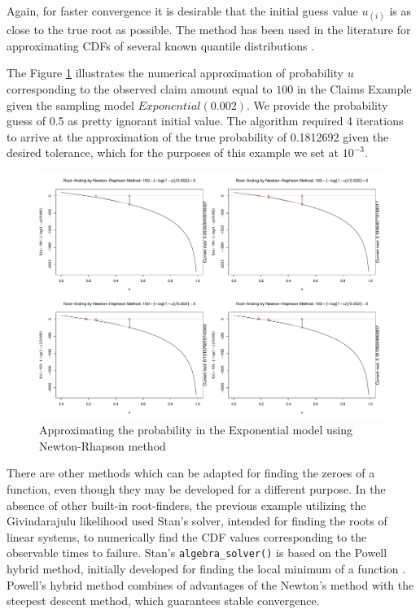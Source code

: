 \documentclass[
  12pt,
]{article}
\begin{document}
Again, for faster convergence it is desirable that the initial guess value \(u_{(i)}\) is as close to the true root as possible. The method has been used in the literature for approximating CDFs of several known quantile distributions \citetext{\citealp[see p.99 in][]{gilchrist2000StatisticalModellingQuantile}; \citealp[p.345 in][]{nair2013QuantileBasedReliabilityAnalysis}}.

The Figure \ref{fig:newton-animation-graph} illustrates the numerical approximation of probability \(u\) corresponding to the observed claim amount equal to \(100\) in the Claims Example given the sampling model \(Exponential(0.002)\). We provide the probability guess of 0.5 as pretty ignorant initial value. The algorithm required 4 iterations to arrive at the approximation of the true probability of 0.1812692 given the desired tolerance, which for the purposes of this example we set at \(10^{-3}\).

\begin{figure}

{\centering \includegraphics[width=0.5\linewidth]{img/newton-graph} 

}

\caption{Approximating the probability  in the Exponential model using Newton-Rhapson method}\label{fig:newton-animation-graph}
\end{figure}

There are other methods which can be adapted for finding the zeroes of a function, even though they may be developed for a different purpose. In the absence of other built-in root-finders, the previous example utilizing the Givindarajulu likelihood used Stan's solver, intended for finding the roots of linear systems, to numerically find the CDF values corresponding to the observable times to failure. Stan's \texttt{algebra\_solver()} is based on the Powell hybrid method, initially developed for finding the local minimum of a function \citep{powell1970HybridMethodNonlinear}. Powell's hybrid method combines of advantages of the Newton's method with the steepest descent method, which guarantees stable convergence.
\end{document}
